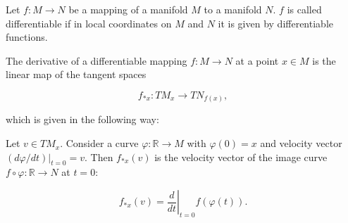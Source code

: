 Let $f: M \to N$ be a mapping of a manifold $M$ to a manifold $N$. $f$ is called differentiable if in local coordinates on $M$ and $N$ it is given by differentiable functions.

The derivative of a differentiable mapping $f: M \to N$ at a point $x \in M$ is the linear map of the tangent spaces

$$f_{*x}: TM_x \to TN_{f(x)},$$

which is given in the following way:

Let $v \in TM_x$. Consider a curve $\varphi: \mathbb{R} \to M$ with $\varphi(0) = x$ and velocity vector $(d\varphi/dt)|_{t=0} = v$. Then $f_{*x}(v)$ is the velocity vector of the image curve $f \circ \varphi: \mathbb{R} \to N$ at $t = 0$:

$$f_{*x}(v) = \left.\frac{d}{dt}\right|_{t=0} f(\varphi(t)).$$
